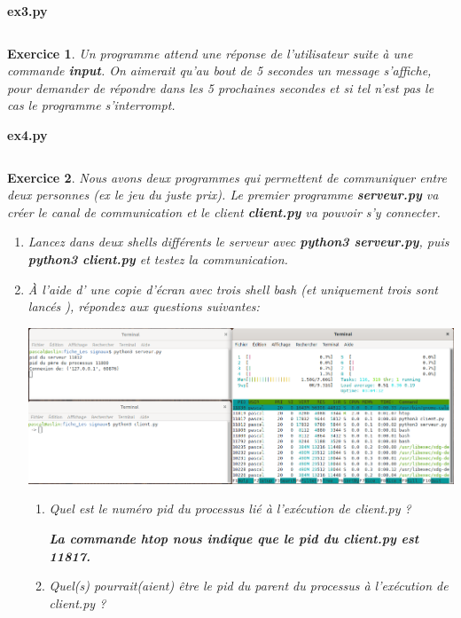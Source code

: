 \documentclass[10pt,french,A4]{article}
\theoremstyle{plain}
\newtheorem{exercice}{Exercice}
\newenvironment{code}[1]{%
    \begin{bclogo}[couleur=backcolour, couleurTexte=black ,couleurBord=blue ,couleurBarre=black, ombre=false,epBord=0.9,logo=\#,arrondi=0.1]{{\bfseries #1}}%
    }%
    {%
    \end{bclogo}
}%
\begin{document}
\ifProf
\begin{code}{ex3.py}
    \inputminted[fontsize=\small]{Python}{ex3.py}
\end{code}
\fi
\begin{exercice}
    Un programme attend une réponse de l'utilisateur suite à une commande \textbf{input}. On aimerait qu'au bout de 5 secondes un message s'affiche, pour demander de répondre dans les 5 prochaines secondes et si tel n'est pas le cas le programme s'interrompt.
    
\end{exercice}
\ifProf
\begin{code}{ex4.py}
    \inputminted[fontsize=\small]{Python}{ex4.py}
\end{code}
\fi
\begin{exercice}
    Nous avons deux programmes qui permettent de communiquer entre deux personnes (ex le jeu du juste prix). Le premier programme \textbf{serveur.py} va créer le canal de communication et le client \textbf{client.py} va pouvoir s'y connecter.
    \begin{enumerate}
        \item Lancez dans deux shells différents le serveur avec \textbf{python3 serveur.py}, puis \textbf{python3 client.py} et testez la communication.
       \item À l'aide d' une copie d'écran avec trois shell bash (et uniquement trois sont lancés ), répondez aux questions suivantes:
       
       \includegraphics[width=1\linewidth]{bash_3x}

    
       \begin{enumerate}
           \item  Quel est le numéro pid du processus lié à  l'exécution de client.py ?
           
             \ifProf
                \textbf{La commande \textit{ htop}  nous indique que le pid du client.py est 11817.}
             \fi
           \item Quel(s) pourrait(aient) être le pid du parent du processus à  l'exécution de client.py ?
           

\end{enumerate}
\end{enumerate}
\end{exercice}
\end{document}
